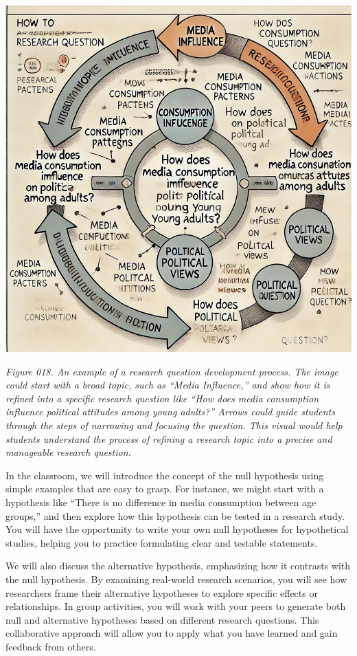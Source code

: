 \documentclass[
]{book}
\begin{document}
\includegraphics[width=1\textwidth,height=\textheight]{images/fig018.jpg}

\emph{Figure 018. An example of a research question development process. The image could start with a broad topic, such as ``Media Influence,'' and show how it is refined into a specific research question like ``How does media consumption influence political attitudes among young adults?'' Arrows could guide students through the steps of narrowing and focusing the question. This visual would help students understand the process of refining a research topic into a precise and manageable research question.}

In the classroom, we will introduce the concept of the null hypothesis using simple examples that are easy to grasp. For instance, we might start with a hypothesis like ``There is no difference in media consumption between age groups,'' and then explore how this hypothesis can be tested in a research study. You will have the opportunity to write your own null hypotheses for hypothetical studies, helping you to practice formulating clear and testable statements.

We will also discuss the alternative hypothesis, emphasizing how it contrasts with the null hypothesis. By examining real-world research scenarios, you will see how researchers frame their alternative hypotheses to explore specific effects or relationships. In group activities, you will work with your peers to generate both null and alternative hypotheses based on different research questions. This collaborative approach will allow you to apply what you have learned and gain feedback from others.
\end{document}
